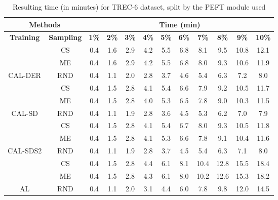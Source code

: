 \begin{table}[htbp]
\begin{subtable}{\linewidth}
\begin{tabular}{c|c|cccccccccc}
\toprule
\multicolumn{2}{c|}{\textbf{Methods}} & \multicolumn{10}{c}{\textbf{Time (min)}} \\
\midrule
\textbf{Training} & \textbf{Sampling} & \textbf{1\%} & \textbf{2\%} & \textbf{3\%} & \textbf{4\%} & \textbf{5\%} & \textbf{6\%} & \textbf{7\%} & \textbf{8\%} & \textbf{9\%} & \textbf{10\%}\\
\midrule
 & CS & 0.4 & 1.6 & 2.9 & 4.2 & 5.5 & 6.8 & 8.1 & 9.5 & 10.8 & 12.1\\

 & ME & 0.4 & 1.6 & 2.9 & 4.2 & 5.5 & 6.8 & 8.0 & 9.3 & 10.6 & 11.9\\

\multirow{-3}{*}{\raggedright\arraybackslash CAL-DER} & RND & 0.4 & 1.1 & 2.0 & 2.8 & 3.7 & 4.6 & 5.4 & 6.3 & 7.2 & 8.0\\
\midrule
 & CS & 0.4 & 1.5 & 2.8 & 4.1 & 5.4 & 6.6 & 7.9 & 9.2 & 10.5 & 11.7\\

 & ME & 0.4 & 1.5 & 2.8 & 4.0 & 5.3 & 6.5 & 7.8 & 9.0 & 10.3 & 11.5\\

\multirow{-3}{*}{\raggedright\arraybackslash CAL-SD} & RND & 0.4 & 1.1 & 1.9 & 2.8 & 3.6 & 4.5 & 5.3 & 6.2 & 7.0 & 7.9\\
\midrule
 & CS & 0.4 & 1.5 & 2.8 & 4.1 & 5.4 & 6.7 & 8.0 & 9.3 & 10.5 & 11.8\\

 & ME & 0.4 & 1.5 & 2.8 & 4.1 & 5.3 & 6.6 & 7.8 & 9.1 & 10.4 & 11.6\\

\multirow{-3}{*}{\raggedright\arraybackslash CAL-SDS2} & RND & 0.4 & 1.1 & 1.9 & 2.8 & 3.7 & 4.5 & 5.4 & 6.3 & 7.1 & 8.0\\
\midrule
 & CS & 0.4 & 1.5 & 2.8 & 4.4 & 6.1 & 8.1 & 10.4 & 12.8 & 15.5 & 18.4\\

 & ME & 0.4 & 1.5 & 2.8 & 4.3 & 6.1 & 8.0 & 10.2 & 12.6 & 15.3 & 18.2\\

\multirow{-3}{*}{\raggedright\arraybackslash AL} & RND & 0.4 & 1.1 & 2.0 & 3.1 & 4.4 & 6.0 & 7.8 & 9.8 & 12.0 & 14.5\\
\bottomrule
\end{tabular}
\end{subtable}
\caption{Resulting time (in minutes) for TREC-6 dataset, split by the PEFT module used}
\label{tab:time_short_trec_10}
\end{table}
